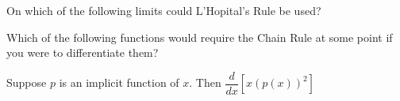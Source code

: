 \documentclass[addpoints]{exam}
\begin{document}
\begin{questions}
\question[2] On which of the following limits could L'Hopital's Rule be used? 

\question[2] Which of the following functions would require the Chain Rule at some point if you were to differentiate them? 



\question[2] Suppose $p$ is an implicit function of $x$. Then $\dfrac{d}{dx}[x (p(x))^2]$ 
	\begin{parts}

\end{parts}
\end{questions}
\end{document}
